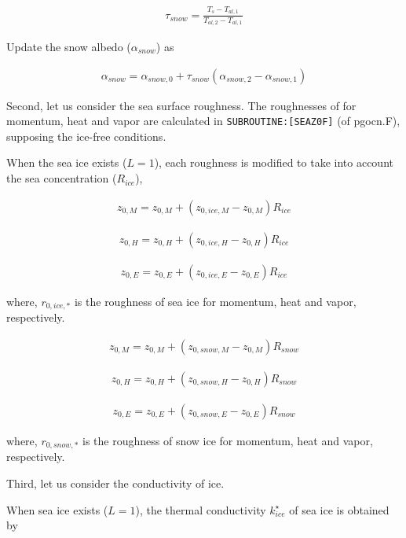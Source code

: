 \begin{itemize}
\begin{eqnarray}
\tau_{snow} = \frac{T_s - T_{al,1}}{T_{al,2}-T_{al,1}}
\end{eqnarray}

Update the snow albedo (\(\alpha_{snow}\)) as

\begin{eqnarray}
    \alpha_{snow} = \alpha_{snow,0} + \tau_{snow}(\alpha_{snow,2}-\alpha_{snow,1})
\end{eqnarray}

Second, let us consider the sea surface roughness. The roughnesses of
for momentum, heat and vapor are calculated in
\texttt{SUBROUTINE:{[}SEAZ0F{]}} (of pgocn.F), supposing the ice-free
conditions.

When the sea ice exists (\(L=1\)), each roughness is modified to take
into account the sea concentration (\(R_{ice}\)),

\begin{eqnarray}
    z_{0,M} = z_{0,M} + ( z_{0,ice,M} - z_{0,M})  R_{ice}
\end{eqnarray}

\begin{eqnarray}
    z_{0,H} = z_{0,H} + ( z_{0,ice,H} - z_{0,H})  R_{ice}
\end{eqnarray}

\begin{eqnarray}
    z_{0,E} = z_{0,E} + ( z_{0,ice,E} - z_{0,E})  R_{ice}
\end{eqnarray}

where, \(r_{0,ice,*}\) is the roughness of sea ice for momentum, heat
and vapor, respectively.

\begin{eqnarray}
    z_{0,M} = z_{0,M} + ( z_{0,snow,M} - z_{0,M})  R_{snow}
\end{eqnarray}

\begin{eqnarray}
    z_{0,H} = z_{0,H} + ( z_{0,snow,H} - z_{0,H})  R_{snow}
\end{eqnarray}

\begin{eqnarray}
    z_{0,E} = z_{0,E} + ( z_{0,snow,E} - z_{0,E})  R_{snow}
\end{eqnarray}

where, \(r_{0,snow,*}\) is the roughness of snow ice for momentum, heat
and vapor, respectively.

Third, let us consider the conductivity of ice.

When sea ice exists (\(L=1\)), the thermal conductivity
\(k_{ice}^\star\) of sea ice is obtained by


\end{itemize}
